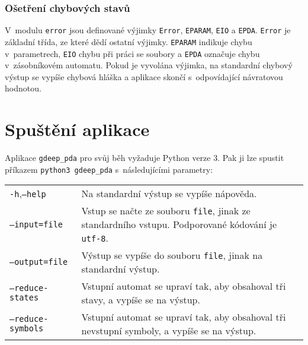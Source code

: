 \subsubsection{Ošetření chybových stavů}

V~modulu \texttt{error} jsou definované výjimky \texttt{Error}, \texttt{EPARAM}, \texttt{EIO} a \texttt{EPDA}. \texttt{Error} je základní třída, ze které dědí ostatní výjimky. \texttt{EPARAM} indikuje chybu v~parametrech, \texttt{EIO} chybu při práci se soubory a \texttt{EPDA} označuje chybu v~zásobníkovém automatu. Pokud je vyvolána výjimka, na standardní chybový výstup se vypíše chybová hláška a aplikace skončí s~odpovídající návratovou hodnotou.



\section{Spuštění aplikace}

Aplikace \texttt{gdeep\_pda} pro svůj běh vyžaduje Python verze 3. Pak ji lze spustit příkazem \texttt{python3 gdeep\_pda} s~následujícími parametry:

\begin{tabular}{l p{10cm}}\\
\texttt{-h},\texttt{--help} 	& Na standardní výstup se vypíše nápověda. \\
\texttt{--input=file}   	& Vstup se načte ze souboru \texttt{file}, jinak ze standardního vstupu. Podporované kódování je \texttt{utf-8}.\\
\texttt{--output=file}  	& Výstup se vypíše do souboru \texttt{file}, jinak na standardní výstup.	\\
\texttt{--reduce-states} 	& Vstupní automat se upraví tak, aby obsahoval tři stavy, a vypíše se na výstup. \\
\texttt{--reduce-symbols} 	& Vstupní automat se upraví tak, aby obsahoval tři nevstupní symboly, a vypíše se na výstup.
\end{tabular}










